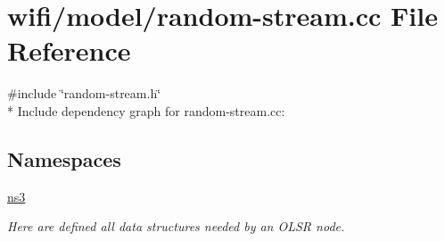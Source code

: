 \hypertarget{random-stream_8cc}{}\section{wifi/model/random-\/stream.cc File Reference}
\label{random-stream_8cc}
{\ttfamily \#include \char`\"{}random-\/stream.\+h\char`\"{}}\\*
Include dependency graph for random-\/stream.cc\+:
\subsection*{Namespaces}
\begin{DoxyCompactItemize}
\item 
 \hyperlink{namespacens3}{ns3}
\begin{DoxyCompactList}\small\item\em Here are defined all data structures needed by an O\+L\+SR node. \end{DoxyCompactList}\end{DoxyCompactItemize}
